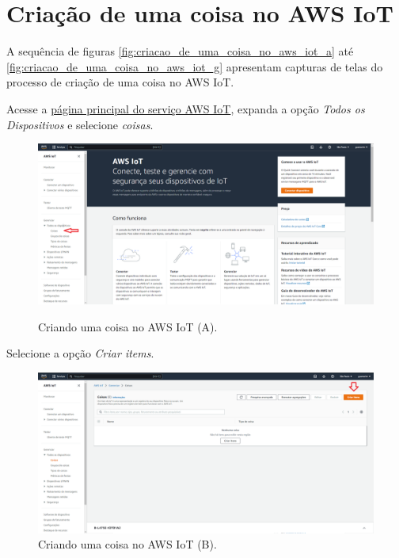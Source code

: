 \section{Criação de uma coisa no AWS IoT}\label{section:criacao_de_uma_coisa_no_aws_iot}

A sequência de figuras \autoref{fig:criacao_de_uma_coisa_no_aws_iot_a} até \autoref{fig:criacao_de_uma_coisa_no_aws_iot_g} apresentam capturas de telas do processo de criação de uma coisa no AWS IoT.

Acesse a \href{https://us-east-1.console.aws.amazon.com/iot/home?region=us-east-1#/home}{página principal do serviço AWS IoT}, expanda a opção \textit{Todos os Dispositivos} e selecione \textit{coisas}.

\begin{figure}[H]
    \centering
    \caption{Criando uma coisa no AWS IoT (A).}
    \includegraphics[scale=0.315]{Imagens/criando_uma_coisa_no_aws_iot_0.png}
    \label{fig:criacao_de_uma_coisa_no_aws_iot_a}
\end{figure}

Selecione a opção \textit{Criar items}.

\begin{figure}[H]
    \centering
    \caption{Criando uma coisa no AWS IoT (B).}
    \includegraphics[scale=0.315]{Imagens/criando_uma_coisa_no_aws_iot_1.png}
\end{figure}

